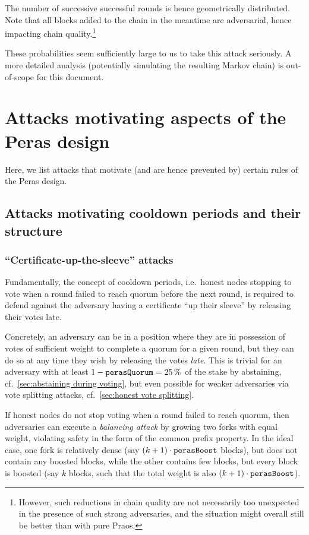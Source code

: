 \begin{enumerate}
  The number of successive successful rounds is hence geometrically distributed.
  Note that all blocks added to the chain in the meantime are adversarial, hence impacting chain quality.\footnote{However, such reductions in chain quality are not necessarily too unexpected in the presence of such strong adversaries, and the situation might overall still be better than with pure Praos.}
\end{enumerate}

These probabilities seem sufficiently large to us to take this attack seriously.
A more detailed analysis (potentially simulating the resulting Markov chain) is out-of-scope for this document.

\section{Attacks motivating aspects of the Peras design}

Here, we list attacks that motivate (and are hence prevented by) certain rules of the Peras design.

\subsection{Attacks motivating cooldown periods and their structure}\label{sec:attack cooldowns}

\subsubsection{\enquote{Certificate-up-the-sleeve} attacks}

Fundamentally, the concept of cooldown periods, i.e.\ honest nodes stopping to vote when a round failed to reach quorum before the next round, is required to defend against the adversary having a certificate \enquote{up their sleeve} by releasing their votes late.

Concretely, an adversary can be in a position where they are in possession of votes of sufficient weight to complete a quorum for a given round, but they can do so at any time they wish by releasing the votes \emph{late}.
This is trivial for an adversary with at least $1-\mathtt{perasQuorum} = \qty{25}{\percent}$ of the stake by abstaining, cf.~\cref{sec:abstaining during voting}, but even possible for weaker adversaries via vote splitting attacks, cf.~\cref{sec:honest vote splitting}.

If honest nodes do not stop voting when a round failed to reach quorum, then adversaries can execute a \emph{balancing attack} by growing two forks with equal weight, violating safety in the form of the common prefix property.
In the ideal case, one fork is relatively dense (say $(k+1) \cdot \mathtt{perasBoost}$ blocks), but does not contain any boosted blocks, while the other contains few blocks, but every block is boosted (say $k$ blocks, such that the total weight is also $(k+1)\cdot\mathtt{perasBoost}$).

